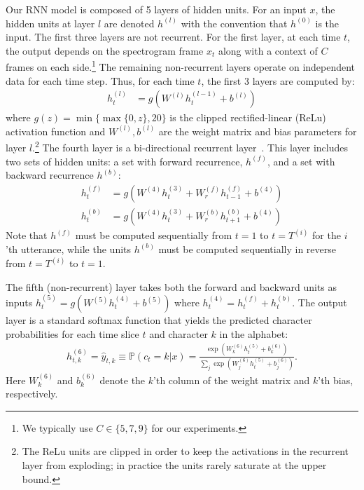 \documentclass{article}
\begin{document}
Our RNN model is composed of 5 layers of hidden units.  For an input $x$, the
hidden units at layer $l$ are denoted $h^{(l)}$ with the convention that
$h^{(0)}$ is the input.  The first three layers are not recurrent.  For the
first layer, at each time $t$, the output depends on the spectrogram frame
$x_t$ along with a context of $C$ frames on each side.\footnote{We typically
use $C\in \{5, 7, 9\}$ for our experiments.} The remaining non-recurrent layers
operate on independent data for each time step.
    Thus, for each time $t$, the first 3 layers are computed by:
        \begin{align*}
            h^{(l)}_t &= g(W^{(l)} h^{(l-1)}_t + b^{(l)})
        \end{align*}
where $g(z) = \min\{\max\{0,z\}, 20\}$ is the clipped rectified-linear (ReLu)
activation function and $W^{(l)}, b^{(l)}$ are the weight matrix and bias
parameters for layer $l$.\footnote{The ReLu units are clipped in order to keep
the activations in the recurrent layer from exploding; in practice the units
rarely saturate at the upper bound.} The fourth layer is a bi-directional
recurrent layer~\cite{schuster1997bidirectional}.  This layer includes two sets
of hidden units:  a set with forward recurrence, $h^{(f)}$, and a set with
backward recurrence $h^{(b)}$:
    \begin{align*}
    h^{(f)}_t &= g(W^{(4)} h^{(3)}_t + W_r^{(f)} h^{(f)}_{t-1} + b^{(4)}) \\
    h^{(b)}_t &= g(W^{(4)} h^{(3)}_t + W_r^{(b)} h^{(b)}_{t+1} + b^{(4)})
    \end{align*}
Note that $h^{(f)}$ must be computed sequentially from $t=1$ to $t=T^{(i)}$ for
the $i$'th utterance, while the units $h^{(b)}$ must be computed sequentially
in reverse from $t=T^{(i)}$ to $t=1$.

The fifth (non-recurrent) layer takes both the forward and backward units as
inputs $h^{(5)}_t = g(W^{(5)} h^{(4)}_t + b^{(5)})$ where $h^{(4)}_t =
h^{(f)}_t + h^{(b)}_t$.  The output layer is a standard softmax function that
yields the predicted character probabilities for each time slice $t$ and
character $k$ in the alphabet:
\begin{align*}
h_{t,k}^{(6)} = \hat{y}_{t,k} \equiv \mathbb{P}(c_t = k|x) =  \frac{\exp(W_k^{(6)} h_t^{(5)}+b_k^{(6)})}{\sum_j \exp(W_j^{(6)} h_t^{(5)}+b_j^{(6)})}.
\end{align*}
Here $W_k^{(6)}$ and $b_k^{(6)}$ denote the $k$'th column of the weight matrix
and $k$'th bias, respectively.  
\end{document}
